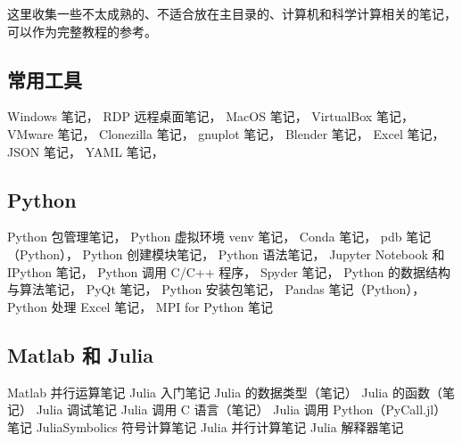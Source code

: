 
这里收集一些不太成熟的、不适合放在主目录的、计算机和科学计算相关的笔记，可以作为完整教程的参考。

\subsection{常用工具}
Windows 笔记，
RDP 远程桌面笔记，
MacOS 笔记，
VirtualBox 笔记，
VMware 笔记，
Clonezilla 笔记，
gnuplot 笔记，
Blender 笔记，
Excel 笔记，
JSON 笔记，
YAML 笔记，

\subsection{Python}
Python 包管理笔记，
Python 虚拟环境 venv 笔记，
Conda 笔记，
pdb 笔记（Python），
Python 创建模块笔记，
Python 语法笔记，
Jupyter Notebook 和 IPython 笔记，
Python 调用 C/C++ 程序，
Spyder 笔记，
Python 的数据结构与算法笔记，
PyQt 笔记，
Python 安装包笔记，
Pandas 笔记（Python），
Python 处理 Excel 笔记，
MPI for Python 笔记

\subsection{Matlab 和 Julia}
Matlab 并行运算笔记
Julia 入门笔记
Julia 的数据类型（笔记）
Julia 的函数（笔记）
Julia 调试笔记
Julia 调用 C 语言（笔记）
Julia 调用 Python（PyCall.jl）笔记
JuliaSymbolics 符号计算笔记
Julia 并行计算笔记
Julia 解释器笔记

